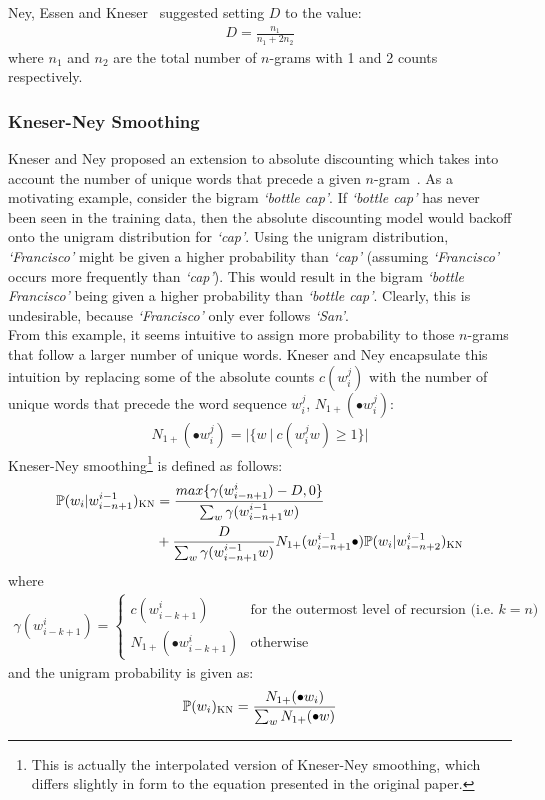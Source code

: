 \documentclass[a4paper, 12pt]{report}
\newcommand{\tit}[1]{\textit{#1}}
\begin{document}
Ney, Essen and Kneser~\cite{absolute_discounting:ney1994} suggested setting $D$ to the value:
\begin{gather}
	D = \frac{n_1}{n_1 + 2n_2}
\end{gather}
where $n_1$ and $n_2$ are the total number of $n$-grams with 1 and 2 counts respectively.

\subsubsection{Kneser-Ney Smoothing}

Kneser and Ney proposed an extension to absolute discounting which takes into account the number of unique words that precede a given $n$-gram~\cite{kneser_ney_smoothing:kneser1995}. As a motivating example, consider the bigram \tit{`bottle cap'}. If \tit{`bottle cap'} has never been seen in the training data, then the absolute discounting model would backoff onto the unigram distribution for \tit{`cap'}. Using the unigram distribution, \tit{`Francisco'} might be given a higher probability than \tit{`cap'} (assuming \tit{`Francisco'} occurs more frequently than \tit{`cap'}). This would result in the bigram \tit{`bottle Francisco'} being given a higher probability than \tit{`bottle cap'}. Clearly, this is undesirable, because \tit{`Francisco'} only ever follows \tit{`San'}. \\

From this example, it seems intuitive to assign more probability to those $n$-grams that follow a larger number of unique words. Kneser and Ney encapsulate this intuition by replacing some of the absolute counts $c(w_i^j)$ with the number of unique words that precede the word sequence $w_i^j$, $N_{1+}(\bullet w_i^j)$:
\begin{gather*}
	N_{1+}(\bullet w_i^j) = |\{w\ |\ c(w_i^jw) \geq 1\}|
\end{gather*}
Kneser-Ney smoothing\footnote{This is actually the interpolated version of Kneser-Ney smoothing, which differs slightly in form to the equation presented in the original paper.} is defined as follows:
\begin{align*}
	\mathbb{P}(w_i | w_{i - n + 1}^{i - 1})_{\text{\scshape KN}} &= \frac{max\{\gamma(w_{i - n + 1}^{i}) - D, 0\}}{\sum_w \gamma(w_{i - n + 1}^{i - 1}w)} \\
	&+ \frac{D}{\sum_w \gamma(w_{i - n + 1}^{i - 1}w)}N_{1+}(w_{i - n + 1}^{i - 1}\bullet)\mathbb{P}(w_i | w_{i - n + 2}^{i - 1})_{\text{\scshape KN}}
\end{align*}
where
\begin{gather}
	\gamma(w_{i - k + 1}^i) = \begin{cases}
		c(w_{i - k + 1}^i) &\text{for the outermost level of recursion (i.e. $k = n$)} \\
		N_{1+}(\bullet w_{i - k + 1}^i) &\text{otherwise}
	\end{cases}
\end{gather}
and the unigram probability is given as:
\begin{gather*}
	\mathbb{P}(w_i)_{\text{\scshape KN}} = \frac{N_{1+}(\bullet w_i)}{\sum_w N_{1+}(\bullet w)}
\end{gather*}
\end{document}
